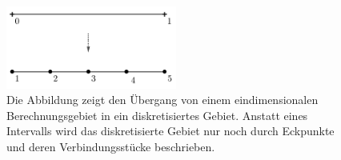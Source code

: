 \documentclass[crop=false]{standalone}
\begin{document}
        \begin{figure}[h]
          \center
          \includegraphics[width=0.5\textwidth]{images/domain_one_dimension_example.pdf}
          \caption[Diskretisierung eines eindimensionalen Berechnungsgebietes]{%
            Die Abbildung zeigt den Übergang von einem eindimensionalen Berechnungsgebiet in ein diskretisiertes Gebiet.
            Anstatt eines Intervalls wird das diskretisierte Gebiet nur noch durch Eckpunkte und deren Verbindungsstücke beschrieben.
          }
          \label{fig:domain-example}
        \end{figure}
\end{document}
